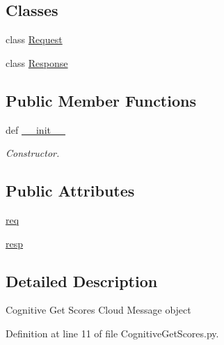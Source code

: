 \subsection*{Classes}
\begin{DoxyCompactItemize}
\item 
class \hyperlink{classRappCloud_1_1CloudMsgs_1_1CognitiveGetScores_1_1CognitiveGetScores_1_1Request}{Request}
\item 
class \hyperlink{classRappCloud_1_1CloudMsgs_1_1CognitiveGetScores_1_1CognitiveGetScores_1_1Response}{Response}
\end{DoxyCompactItemize}
\subsection*{Public Member Functions}
\begin{DoxyCompactItemize}
\item 
def \hyperlink{classRappCloud_1_1CloudMsgs_1_1CognitiveGetScores_1_1CognitiveGetScores_aa50cb7ebee7d11b4037b21851e1f23ee}{\-\_\-\-\_\-init\-\_\-\-\_\-}
\begin{DoxyCompactList}\small\item\em Constructor. \end{DoxyCompactList}\end{DoxyCompactItemize}
\subsection*{Public Attributes}
\begin{DoxyCompactItemize}
\item 
\hyperlink{classRappCloud_1_1CloudMsgs_1_1CognitiveGetScores_1_1CognitiveGetScores_a0e52891359faef994878cc62e7d835ba}{req}
\item 
\hyperlink{classRappCloud_1_1CloudMsgs_1_1CognitiveGetScores_1_1CognitiveGetScores_a906289c82bbcf58174e51b2b927ee76f}{resp}
\end{DoxyCompactItemize}


\subsection{Detailed Description}
\begin{DoxyVerb}Cognitive Get Scores Cloud Message object \end{DoxyVerb}
 

Definition at line 11 of file Cognitive\-Get\-Scores.\-py.



